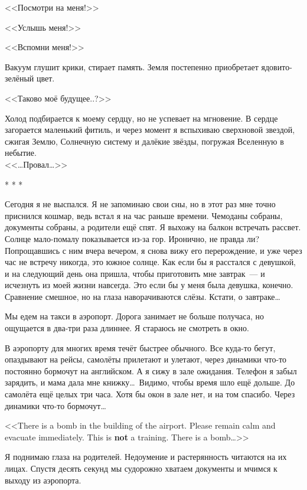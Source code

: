 \documentclass[openany, oneside]{book}
\begin{document}
<<Посмотри на меня!>>

<<Услышь меня!>>

<<Вспомни меня!>>

Вакуум глушит крики, стирает память. Земля постепенно приобретает ядовито-зелёный цвет.

<<Таково моё будущее..?>>

Холод подбирается к моему сердцу, но не успевает на мгновение. В сердце загорается маленький фитиль, и через момент я вспыхиваю сверхновой звездой, сжигая Землю, Солнечную систему и далёкие звёзды, погружая Вселенную в небытие.\\

<<\dots Провал\dots>>

\begin{center}
    * * *
\end{center}

Сегодня я не выспался. Я не запоминаю свои сны, но в этот раз мне точно приснился кошмар, ведь встал я на час раньше времени. Чемоданы собраны, документы собраны, а родители ещё спят. Я выхожу на балкон встречать рассвет. Солнце мало-помалу показывается из-за гор. Иронично, не правда ли? Попрощавшись с ним вчера вечером, я снова вижу его перерождение, и уже через час не встречу никогда, это южное солнце. Как если бы я расстался с девушкой, и на следующий день она пришла, чтобы приготовить мне завтрак~--- и исчезнуть из моей жизни навсегда. Это если бы у меня была девушка, конечно. Сравнение смешное, но на глаза наворачиваются слёзы. Кстати, о завтраке\dots

Мы едем на такси в аэропорт. Дорога занимает не больше получаса, но ощущается в два-три раза длиннее. Я стараюсь не смотреть в окно.

В аэропорту для многих время течёт быстрее обычного. Все куда-то бегут, опаздывают на рейсы, самолёты прилетают и улетают, через динамики что-то постоянно бормочут на английском. А я сижу в зале ожидания. Телефон я забыл зарядить, и мама дала мне книжку\dots \ Видимо, чтобы время шло ещё дольше. До самолёта ещё целых три часа. Хотя бы окон в зале нет, и на том спасибо. Через динамики что-то бормочут\dots

<<There is a bomb in the building of the airport. Please remain calm and evacuate immediately. This is \textbf{not} a training. There is a bomb\dots>>

Я поднимаю глаза на родителей. Недоумение и растерянность читаются на их лицах. Спустя десять секунд мы судорожно хватаем документы и мчимся к выходу из аэропорта.
\end{document}
